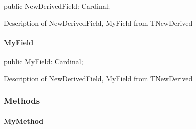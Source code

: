 \documentclass{report}
\begin{document}
\begin{list}{}{
\setlength{\itemindent}{0cm}
\setlength{\listparindent}{0cm}
\setlength{\leftmargin}{\evensidemargin}
\addtolength{\leftmargin}{\tmplength}
\settowidth{\labelsep}{X}
\addtolength{\leftmargin}{\labelsep}
\setlength{\labelwidth}{\tmplength}
}
\begin{flushleft}
\item[\textbf{Declaration}\hfill]
\begin{ttfamily}
public NewDerivedField: Cardinal;\end{ttfamily}


\end{flushleft}
\par
\item[\textbf{Description}]
Description of NewDerivedField, MyField from TNewDerived

\end{list}
\paragraph*{MyField}\hspace*{\fill}

\begin{list}{}{
\setlength{\itemindent}{0cm}
\setlength{\listparindent}{0cm}
\setlength{\leftmargin}{\evensidemargin}
\addtolength{\leftmargin}{\tmplength}
\settowidth{\labelsep}{X}
\addtolength{\leftmargin}{\labelsep}
\setlength{\labelwidth}{\tmplength}
}
\begin{flushleft}
\item[\textbf{Declaration}\hfill]
\begin{ttfamily}
public MyField: Cardinal;\end{ttfamily}


\end{flushleft}
\par
\item[\textbf{Description}]
Description of NewDerivedField, MyField from TNewDerived

\end{list}
\subsubsection*{\large{\textbf{Methods}}\normalsize\hspace{1ex}\hfill}
\paragraph*{MyMethod}\hspace*{\fill}
\end{document}
